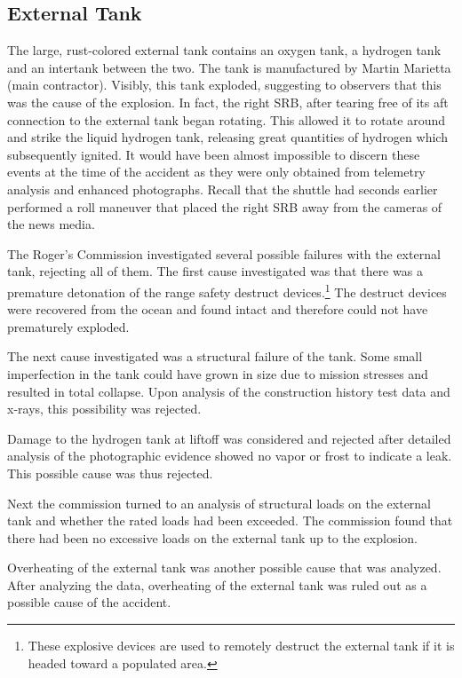 \subsection{External Tank}

The large, rust-colored external tank contains an oxygen
tank, a hydrogen tank and an intertank between the two.
The tank is manufactured by Martin Marietta (main
contractor).
Visibly, this tank exploded, suggesting to observers that
this was the cause of the explosion.
In fact, the right SRB, after tearing free of its aft
connection to the external tank began rotating.
This allowed it to rotate around and strike the liquid
hydrogen tank, releasing great quantities of hydrogen which
subsequently ignited.
It would have been almost impossible to discern these events
at the time of the accident as they were only obtained from
telemetry analysis and enhanced photographs.
Recall that the shuttle had seconds earlier performed a roll
maneuver that placed the right SRB away from the cameras of
the news media.

The Roger's Commission investigated several possible
failures with the external tank, rejecting all of them.
The first cause investigated was that there was a premature
detonation of the range safety destruct
devices.\footnote{These explosive devices are used to
remotely destruct the external tank if it is headed toward a
populated area.}
The destruct devices were recovered from the ocean and found
intact and therefore could not have prematurely exploded.

The next cause investigated was a structural failure of the
tank.
Some small imperfection in the tank could have grown in size
due to mission stresses and resulted in total collapse.
Upon analysis of the construction history test data and
x-rays, this possibility was rejected.

Damage to the hydrogen tank at liftoff was considered and
rejected after detailed analysis of the photographic
evidence showed no vapor or frost to indicate a leak.
This possible cause was thus rejected.

Next the commission turned to an analysis of structural
loads on the external tank and whether the rated loads had
been exceeded.
The commission found that there had been no excessive loads
on the external tank up to the explosion.

Overheating of the external tank was another possible cause
that was analyzed.
After analyzing the data, overheating of the external tank
was ruled out as a possible cause of the accident.

